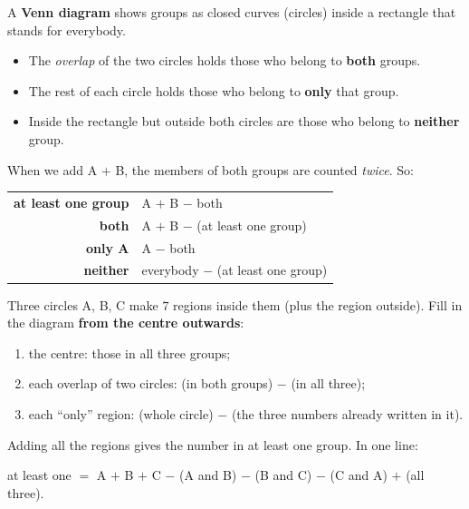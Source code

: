 \begin{knowbox}
A \textbf{Venn diagram} shows groups as closed curves (circles) inside a rectangle that stands for everybody.
\begin{center}
\end{center}
\begin{itemize}[leftmargin=1.4em,itemsep=3pt]
\item The \emph{overlap} of the two circles holds those who belong to \textbf{both} groups.
\item The rest of each circle holds those who belong to \textbf{only} that group.
\item Inside the rectangle but outside both circles are those who belong to \textbf{neither} group.
\end{itemize}
When we add A $+$ B, the members of both groups are counted \emph{twice}. So:
\begin{center}
\renewcommand{\arraystretch}{1.3}
\begin{tabular}{@{}r@{\ $=$\ }l@{}}
\textbf{at least one group} & A $+$ B $-$ both\\
\textbf{both} & A $+$ B $-$ (at least one group)\\
\textbf{only A} & A $-$ both\\
\textbf{neither} & everybody $-$ (at least one group)\\
\end{tabular}
\end{center}
\end{knowbox}
\begin{knowbox}
Three circles A, B, C make $7$ regions inside them (plus the region outside). Fill in the diagram \textbf{from the centre outwards}:
\begin{enumerate}[leftmargin=1.6em,itemsep=2pt]
\item the centre: those in all three groups;
\item each overlap of two circles: (in both groups) $-$ (in all three);
\item each ``only'' region: (whole circle) $-$ (the three numbers already written in it).
\end{enumerate}
Adding all the regions gives the number in at least one group. In one line:
\begin{center}
at least one $=$ A $+$ B $+$ C $-$ (A and B) $-$ (B and C) $-$ (C and A) $+$ (all three).
\end{center}
\end{knowbox}
